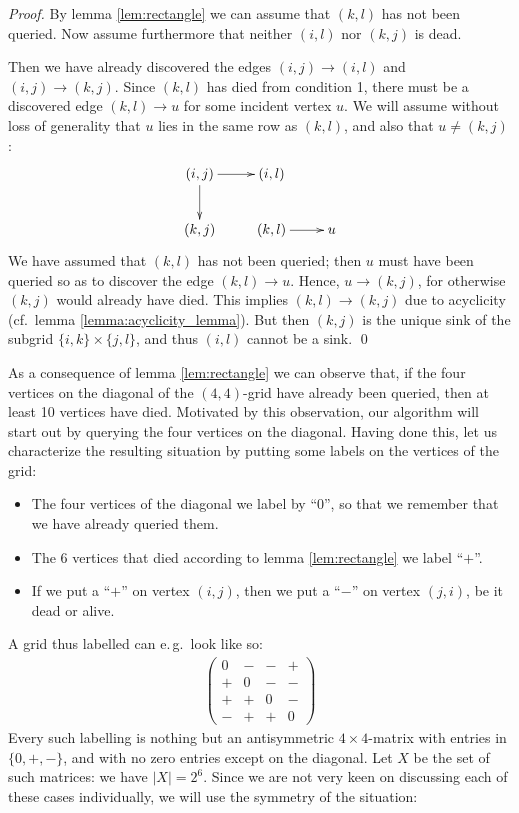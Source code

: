 \documentclass[runningheads,a4paper]{llncs}
\begin{document}
\begin{proof}
    By lemma \ref{lem:rectangle} we can assume that $(k,l)$ has not been
    queried.
    Now assume furthermore that neither $(i,l)$ nor $(k,j)$ is dead.

    Then we have already discovered the edges $(i,j) \to (i,l)$ and $(i,j) \to
    (k,j)$.
    Since $(k,l)$ has died from condition 1, there must be a discovered edge
    $(k,l) \to u$ for some incident vertex $u$.
    We will assume without loss of generality that $u$ lies in the same row as
    $(k,l)$, and also that $u \neq (k,j)$:
    \begin{align*}
        \xymatrix{
            (i,j) \ar[d] \ar[r] & (i,l)
            \\
            (k,j) & (k,l) \ar[r] & u
        }
    \end{align*}
    We have assumed that $(k,l)$ has not been queried; then $u$ must have been
    queried so as to discover the edge $(k,l) \to u$.
    Hence, $u \to (k,j)$, for otherwise $(k,j)$ would already have died.
    This implies $(k,l) \to (k,j)$ due to acyclicity (cf.~lemma
    \ref{lemma:acyclicity_lemma}).
    But then $(k,j)$ is the unique sink of the subgrid
    $\{i,k\} \times \{j,l\}$,
    and thus $(i,l)$ cannot be a sink. \qed
\end{proof}

As a consequence of lemma \ref{lem:rectangle} we can observe that,
if the four vertices on the diagonal of the $(4,4)$-grid have already
been queried, then at least 10 vertices have died.
Motivated by this observation, our algorithm will start out by querying
the four vertices on the diagonal.
Having done this, let us characterize the resulting situation by putting some
labels on the vertices of the grid:
\begin{itemize}
    \item
        The four vertices of the diagonal we label by ``$0$'', so that we
        remember that we have already queried them.
    \item
        The 6 vertices that died according to lemma \ref{lem:rectangle} we label
        ``$+$''.
    \item
        If we put a ``$+$'' on vertex $(i,j)$, then we put a ``$-$'' on vertex
        $(j,i)$, be it dead or alive.
\end{itemize}
A grid thus labelled can e.\,g.~look like so:
\begin{align*}
    \begin{pmatrix}
        0 & - & - & +
        \\
        + & 0 & - & -
        \\
        + & + & 0 & -
        \\
        - & + & + & 0
    \end{pmatrix}
\end{align*}
Every such labelling is nothing but an antisymmetric $4 \times 4$-matrix with
entries in $\{0,+,-\}$, and with no zero entries except on the diagonal.
Let $X$ be the set of such matrices: we have $|X| = 2^6$.
Since we are not very keen on discussing each of these cases individually, we
will use the symmetry of the situation:
\end{document}
